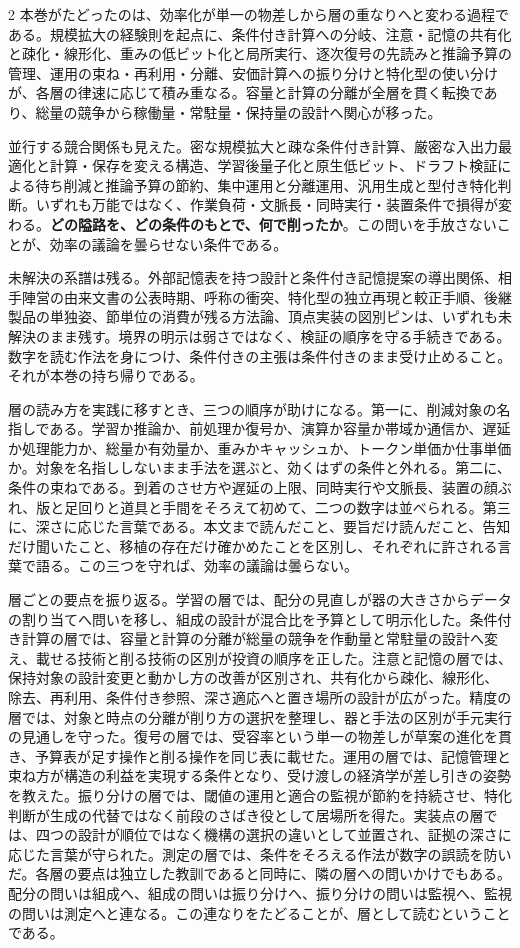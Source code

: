 \documentclass[lualatex,a4paper,10pt]{jlreq}
\begin{document}
\begin{multicols}{2}
\raggedcolumns
本巻がたどったのは、効率化が単一の物差しから層の重なりへと変わる過程である。規模拡大の経験則を起点に、条件付き計算への分岐、注意・記憶の共有化と疎化・線形化、重みの低ビット化と局所実行、逐次復号の先読みと推論予算の管理、運用の束ね・再利用・分離、安価計算への振り分けと特化型の使い分けが、各層の律速に応じて積み重なる。容量と計算の分離が全層を貫く転換であり、総量の競争から稼働量・常駐量・保持量の設計へ関心が移った。

並行する競合関係も見えた。密な規模拡大と疎な条件付き計算、厳密な入出力最適化と計算・保存を変える構造、学習後量子化と原生低ビット、ドラフト検証による待ち削減と推論予算の節約、集中運用と分離運用、汎用生成と型付き特化判断。いずれも万能ではなく、作業負荷・文脈長・同時実行・装置条件で損得が変わる。\textbf{どの隘路を、どの条件のもとで、何で削ったか}。この問いを手放さないことが、効率の議論を曇らせない条件である。

未解決の系譜は残る。外部記憶表を持つ設計と条件付き記憶提案の導出関係、相手陣営の由来文書の公表時期、呼称の衝突、特化型の独立再現と較正手順、後継製品の単独姿、節単位の消費が残る方法論、頂点実装の図別ピンは、いずれも未解決のまま残す。境界の明示は弱さではなく、検証の順序を守る手続きである。数字を読む作法を身につけ、条件付きの主張は条件付きのまま受け止めること。それが本巻の持ち帰りである。

層の読み方を実践に移すとき、三つの順序が助けになる。第一に、削減対象の名指しである。学習か推論か、前処理か復号か、演算か容量か帯域か通信か、遅延か処理能力か、総量か有効量か、重みかキャッシュか、トークン単価か仕事単価か。対象を名指ししないまま手法を選ぶと、効くはずの条件と外れる。第二に、条件の束ねである。到着のさせ方や遅延の上限、同時実行や文脈長、装置の顔ぶれ、版と足回りと道具と手間をそろえて初めて、二つの数字は並べられる。第三に、深さに応じた言葉である。本文まで読んだこと、要旨だけ読んだこと、告知だけ聞いたこと、移植の存在だけ確かめたことを区別し、それぞれに許される言葉で語る。この三つを守れば、効率の議論は曇らない。

層ごとの要点を振り返る。学習の層では、配分の見直しが器の大きさからデータの割り当てへ問いを移し、組成の設計が混合比を予算として明示化した。条件付き計算の層では、容量と計算の分離が総量の競争を作動量と常駐量の設計へ変え、載せる技術と削る技術の区別が投資の順序を正した。注意と記憶の層では、保持対象の設計変更と動かし方の改善が区別され、共有化から疎化、線形化、除去、再利用、条件付き参照、深さ適応へと置き場所の設計が広がった。精度の層では、対象と時点の分離が削り方の選択を整理し、器と手法の区別が手元実行の見通しを守った。復号の層では、受容率という単一の物差しが草案の進化を貫き、予算表が足す操作と削る操作を同じ表に載せた。運用の層では、記憶管理と束ね方が構造の利益を実現する条件となり、受け渡しの経済学が差し引きの姿勢を教えた。振り分けの層では、閾値の運用と適合の監視が節約を持続させ、特化判断が生成の代替ではなく前段のさばき役として居場所を得た。実装点の層では、四つの設計が順位ではなく機構の選択の違いとして並置され、証拠の深さに応じた言葉が守られた。測定の層では、条件をそろえる作法が数字の誤読を防いだ。各層の要点は独立した教訓であると同時に、隣の層への問いかけでもある。配分の問いは組成へ、組成の問いは振り分けへ、振り分けの問いは監視へ、監視の問いは測定へと連なる。この連なりをたどることが、層として読むということである。


\end{multicols}
\end{document}
